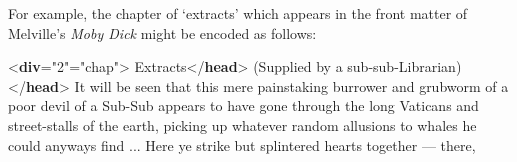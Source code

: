  For example, the chapter of ‘extracts’ which appears in the front matter of Melville's \textit{Moby Dick} might be encoded as follows: \par\bgroup{}\exampleFont \begin{shaded}\noindent\mbox{}{<\textbf{div}\hspace*{1em}{n}="{2}"\hspace*{1em}{type}="{chap}">}\mbox{}\newline 
{}Extracts{</\textbf{head}>}\mbox{}\newline 
{}(Supplied by a sub-sub-Librarian){</\textbf{head}>}\mbox{}\newline 
{}It will be seen that this mere painstaking burrower and\mbox{}\newline 
\hspace*{1em}\hspace*{1em} grubworm of a poor devil of a Sub-Sub appears to have gone\mbox{}\newline 
\hspace*{1em}\hspace*{1em} through the long Vaticans and street-stalls of the earth,\mbox{}\newline 
\hspace*{1em}\hspace*{1em} picking up whatever random allusions to whales he could\mbox{}\newline 
\hspace*{1em}\hspace*{1em} anyways find ...\mbox{}\newline 
\hspace*{1em}\hspace*{1em} Here ye strike but splintered hearts together — there,\mbox{}\newline 

\end{shaded}
